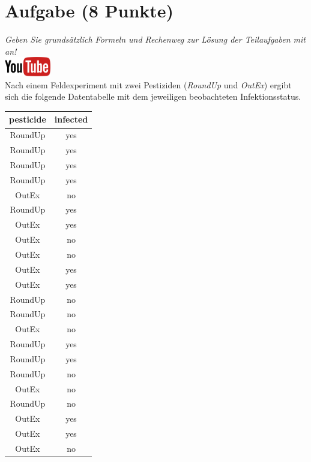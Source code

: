 \documentclass[a4paper, 10pt]{scrartcl}\usepackage[]{graphicx}\usepackage[]{xcolor}
\begin{document}
\section{Aufgabe \hfill (8 Punkte)}

\textit{Geben Sie grunds{\"a}tzlich Formeln und Rechenweg zur L{\"o}sung der
  Teilaufgaben mit an!} \\[1Ex]

\hfill\href{https://youtu.be/t_1KL77mfmg}{\includegraphics[width =
  2cm]{img/youtube}}\\[1Ex]

Nach einem Feldexperiment mit zwei Pestiziden (\textit{RoundUp} und
\textit{OutEx}) ergibt sich die folgende Datentabelle mit dem jeweiligen
beobachteten Infektionsstatus.

\begin{table}[!h]
\centering
\begin{tabular}{cc}
\toprule
pesticide & infected\\
\midrule
RoundUp & yes\\
RoundUp & yes\\
RoundUp & yes\\
RoundUp & yes\\
OutEx & no\\
\addlinespace
RoundUp & yes\\
OutEx & yes\\
OutEx & no\\
OutEx & no\\
OutEx & yes\\
\addlinespace
OutEx & yes\\
RoundUp & no\\
RoundUp & no\\
OutEx & no\\
RoundUp & yes\\
\addlinespace
RoundUp & yes\\
RoundUp & no\\
OutEx & no\\
RoundUp & no\\
OutEx & yes\\
\addlinespace
OutEx & yes\\
OutEx & no\\
\bottomrule
\end{tabular}
\end{table}
\end{document}
